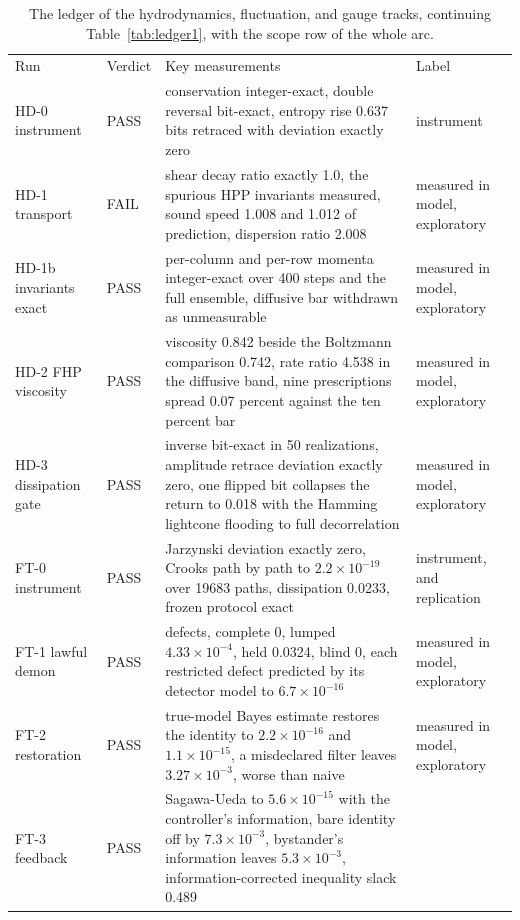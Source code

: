\documentclass[aps,pre,reprint,nofootinbib,floatfix]{revtex4-2}
\begin{document}
\begin{table}[t]
\caption{The ledger of the hydrodynamics, fluctuation, and gauge
tracks, continuing Table~\ref{tab:ledger1}, with the scope row of
the whole arc.}
\label{tab:ledger2}
\begin{ruledtabular}
\begin{tabular}{L{1.7cm}lL{10.6cm}L{2.7cm}}
Run & Verdict & Key measurements & Label \\
\colrule
HD-0 instrument & PASS & conservation integer-exact, double
reversal bit-exact, entropy rise 0.637 bits retraced with deviation
exactly zero & instrument \\
HD-1 transport & FAIL & shear decay ratio exactly 1.0, the spurious
HPP invariants measured, sound speed 1.008 and 1.012 of prediction,
dispersion ratio 2.008 & measured in model, exploratory \\
HD-1b invariants exact & PASS & per-column and per-row momenta
integer-exact over 400 steps and the full ensemble, diffusive bar
withdrawn as unmeasurable & measured in model, exploratory \\
HD-2 FHP viscosity & PASS & viscosity 0.842 beside the Boltzmann
comparison 0.742, rate ratio 4.538 in the diffusive band, nine
prescriptions spread 0.07 percent against the ten percent bar &
measured in model, exploratory \\
HD-3 dissipation gate & PASS & inverse bit-exact in 50
realizations, amplitude retrace deviation exactly zero, one flipped
bit collapses the return to 0.018 with the Hamming lightcone
flooding to full decorrelation & measured in model, exploratory \\
FT-0 instrument & PASS & Jarzynski deviation exactly zero, Crooks
path by path to $2.2\times10^{-19}$ over 19683 paths, dissipation
0.0233, frozen protocol exact & instrument, and replication \\
FT-1 lawful demon & PASS & defects, complete 0, lumped
$4.33\times10^{-4}$, held 0.0324, blind 0, each restricted defect
predicted by its detector model to $6.7\times10^{-16}$ & measured
in model, exploratory \\
FT-2 restoration & PASS & true-model Bayes estimate restores the
identity to $2.2\times10^{-16}$ and $1.1\times10^{-15}$, a
misdeclared filter leaves $3.27\times10^{-3}$, worse than naive &
measured in model, exploratory \\
FT-3 feedback & PASS & Sagawa-Ueda to $5.6\times10^{-15}$ with the
controller's information, bare identity off by
$7.3\times10^{-3}$, bystander's information leaves
$5.3\times10^{-3}$, information-corrected inequality slack 0.489

\end{tabular}
\end{ruledtabular}
\end{table}
\end{document}
